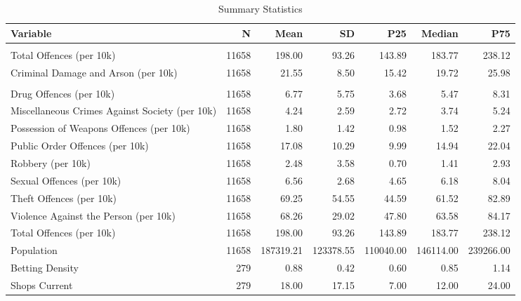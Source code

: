 \begin{table}[!h]
\centering
\caption{\label{tab:tab:summary}Summary Statistics}
\centering
\begin{tabular}[t]{lrrrrrr}
\toprule
Variable & N & Mean & SD & P25 & Median & P75\\
\midrule
\addlinespace[0.3em]
\multicolumn{7}{l}{\textbf{Cross-Section (CSP)}}\\
\hspace{1em}Total Offences (per 10k) & 11658 & 198.00 & 93.26 & 143.89 & 183.77 & \vphantom{1} 238.12\\
\hspace{1em}Criminal Damage and Arson (per 10k) & 11658 & 21.55 & 8.50 & 15.42 & 19.72 & 25.98\\
\addlinespace[0.3em]
\multicolumn{7}{l}{\textbf{Panel Variables (CSP × Quarter)}}\\
\hspace{1em}Drug Offences (per 10k) & 11658 & 6.77 & 5.75 & 3.68 & 5.47 & 8.31\\
\hspace{1em}Miscellaneous Crimes Against Society (per 10k) & 11658 & 4.24 & 2.59 & 2.72 & 3.74 & 5.24\\
\hspace{1em}Possession of Weapons Offences (per 10k) & 11658 & 1.80 & 1.42 & 0.98 & 1.52 & 2.27\\
\hspace{1em}Public Order Offences (per 10k) & 11658 & 17.08 & 10.29 & 9.99 & 14.94 & 22.04\\
\hspace{1em}Robbery (per 10k) & 11658 & 2.48 & 3.58 & 0.70 & 1.41 & 2.93\\
\hspace{1em}Sexual Offences (per 10k) & 11658 & 6.56 & 2.68 & 4.65 & 6.18 & 8.04\\
\hspace{1em}Theft Offences (per 10k) & 11658 & 69.25 & 54.55 & 44.59 & 61.52 & 82.89\\
\hspace{1em}Violence Against the Person (per 10k) & 11658 & 68.26 & 29.02 & 47.80 & 63.58 & 84.17\\
\hspace{1em}Total Offences (per 10k) & 11658 & 198.00 & 93.26 & 143.89 & 183.77 & 238.12\\
\hspace{1em}Population & 11658 & 187319.21 & 123378.55 & 110040.00 & 146114.00 & 239266.00\\
\hspace{1em}Betting Density & 279 & 0.88 & 0.42 & 0.60 & 0.85 & 1.14\\
\hspace{1em}Shops Current & 279 & 18.00 & 17.15 & 7.00 & 12.00 & 24.00\\
\bottomrule
\end{tabular}
\end{table}
